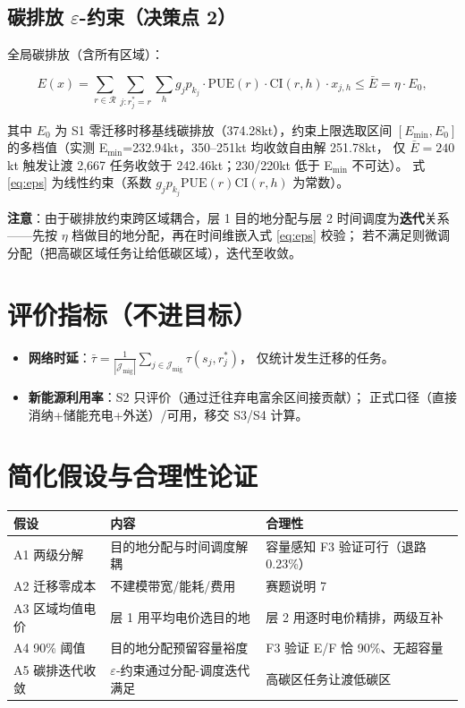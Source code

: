 \documentclass{internal-report}
\begin{document}
\subsection{碳排放 $\varepsilon$-约束（决策点 2）}

全局碳排放（含所有区域）：

\begin{equation}
  E(x) = \sum_{r \in \mathcal{R}} \sum_{j: r^*_j = r} \sum_{h}
  g_j p_{k_j} \cdot \text{PUE}(r) \cdot \text{CI}(r, h) \cdot x_{j,h}
  \le \bar{E} = \eta \cdot E_0,
  \label{eq:eps}
\end{equation}

其中 $E_0$ 为 S1 零迁移时移基线碳排放（374.28kt），约束上限选取区间
$[E_{\text{min}}, E_0]$ 的多档值（实测 E$_{\text{min}}$=232.94kt，350--251kt 均收敛自由解 251.78kt，
仅 $\bar{E}=240$kt 触发让渡 2{,}667 任务收敛于 242.46kt；230/220kt 低于 E$_{\text{min}}$ 不可达）。
式 \eqref{eq:eps} 为线性约束（系数 $g_j p_{k_j}\text{PUE}(r)\text{CI}(r,h)$ 为常数）。

\textbf{注意}：由于碳排放约束跨区域耦合，层 1 目的地分配与层 2 时间调度为\textbf{迭代}关系
——先按 $\eta$ 档做目的地分配，再在时间维嵌入式 \eqref{eq:eps} 校验；
若不满足则微调分配（把高碳区域任务让给低碳区域），迭代至收敛。

\section{评价指标（不进目标）}

\begin{itemize}
  \item \textbf{网络时延}：$\bar{\tau} = \frac{1}{|\mathcal{J}_{\text{mig}}|} \sum_{j \in \mathcal{J}_{\text{mig}}} \tau(s_j, r^*_j)$，
        仅统计发生迁移的任务。
  \item \textbf{新能源利用率}：S2 只评价（通过迁往弃电富余区间接贡献）；
        正式口径（直接消纳+储能充电+外送）/可用，移交 S3/S4 计算。
\end{itemize}

\section{简化假设与合理性论证}

\begin{center}
\footnotesize
\begin{tabular}{p{4cm}p{5.2cm}p{4.6cm}}
\toprule
假设 & 内容 & 合理性 \\
\midrule
A1 两级分解 & 目的地分配与时间调度解耦 & 容量感知 F3 验证可行（退路 0.23\%） \\
A2 迁移零成本 & 不建模带宽/能耗/费用 & 赛题说明 7 \\
A3 区域均值电价 & 层 1 用平均电价选目的地 & 层 2 用逐时电价精排，两级互补 \\
A4 90\% 阈值 & 目的地分配预留容量裕度 & F3 验证 E/F 恰 90\%、无超容量 \\
A5 碳排迭代收敛 & $\varepsilon$-约束通过分配-调度迭代满足 & 高碳区任务让渡低碳区 \\
\bottomrule
\end{tabular}
\end{center}
\end{document}

